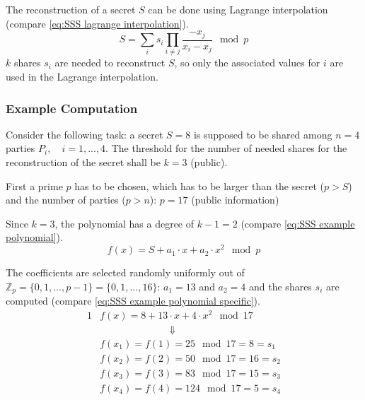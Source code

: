 			
		
		The reconstruction of a secret $S$ can be done using Lagrange interpolation (compare \ref{eq:SSS lagrange interpolation}).
		\begin{equation}
		\label{eq:SSS lagrange interpolation}
		S = \sum_i s_i \prod_{i \neq j} \frac{-x_j}{x_i-x_j} \mod p
		\end{equation}
		 $k$ shares $s_i$ are needed to reconstruct $S$, so only the associated values for $i$ are used in the Lagrange interpolation.
						
		\subsubsection*{Example Computation} \label{Example Computation}
		
		Consider the following task: a secret $S=8$ is supposed to be shared among $n=4$ parties $P_i,\quad i=1,...,4$. The threshold for the number of needed shares for the reconstruction of the secret shall be $k=3$ (public).
		
		First a prime $p$ has to be chosen, which has to be larger than the secret ($p>S$) and the number of parties ($p>n$): $p=17$ (public information)
		
		Since $k=3$, the polynomial has a degree of $k-1=2$ (compare \ref{eq:SSS example polynomial}).
		\begin{equation}
		\label{eq:SSS example polynomial}
		f(x) = S + a_1 \cdot x + a_2 \cdot x^2 \mod p
		\end{equation}
		 
		 The coefficients are selected randomly uniformly out of $\mathbb{Z}_p=\{0,1,...,p-1\}=\{0,1,...,16\}$: $a_1=13$ and $a_2=4$ and the shares $s_i$ are computed (compare \ref{eq:SSS example polynomial specific}).
		 \begin{alignat}{1}
		 & f(x) = 8 + 13 \cdot x + 4 \cdot x^2 \mod 17 \label{eq:SSS example polynomial specific} \\
		 &\qquad \qquad \qquad \quad \Downarrow \nonumber \\ 
		 & f(x_1)=f(1)=25\mod17=8=s_1 \nonumber \\
		 & f(x_2)=f(2)=50\mod17=16=s_2 \nonumber \\
		 & f(x_3)=f(3)=83\mod17=15=s_3 \nonumber \\
		 & f(x_4)=f(4)=124\mod17=5=s_4 \nonumber 
		 \end{alignat}
		 
